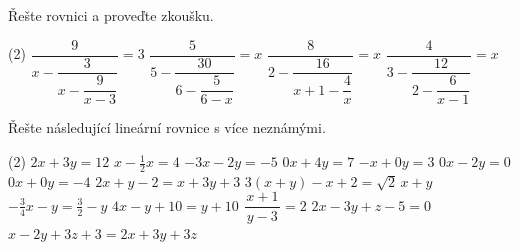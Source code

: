 \documentclass[12pt,a4paper]{article}
\begin{document}
\begin{exercise}
  Řešte rovnici a proveďte zkoušku.
  \begin{tasks}(2)
    \task \(\dfrac{9}{x - \dfrac{3}{x - \dfrac{9}{x - 3}}} = 3\)
    \task \(\dfrac{5}{5 - \dfrac{30}{6 - \dfrac{5}{6 - x}}} = x\)
    \task \(\dfrac{8}{2 - \dfrac{16}{x + 1 - \dfrac{4}{x}}} = x\)
    \task \(\dfrac{4}{3 - \dfrac{12}{2 - \dfrac{6}{x - 1}}} = x\)
  \end{tasks}
\end{exercise}


\setcounter{section}{6}
\begin{exercise}
  Řešte následující lineární rovnice s více neznámými.
  \begin{tasks}(2)
    \task \(2x + 3y = 12\)
    \task $x - \frac{1}{2}x = 4$
    \task $-3x - 2y = -5$
    \task $0x + 4y = 7$
    \task $-x + 0y = 3$
    \task $0x - 2y = 0$
    \task $0x + 0y = -4$
    \task \(2x + y - 2 = x + 3y + 3\)
    \task \(3(x+y) - x + 2 = \sqrt{2}\,x + y\)
    \task \(-\tfrac{3}{4}x - y = \tfrac{3}{2} - y\)
    \task \(4x - y + 10 = y + 10\)
    \task \(\dfrac{x+1}{\,y-3\,} = 2\)
    \task \(2x - 3y + z - 5 = 0\)
    \task \(x - 2y + 3z + 3 = 2x + 3y + 3z\)
  \end{tasks}
\end{exercise}


\setcounter{section}{7}
\end{document}
